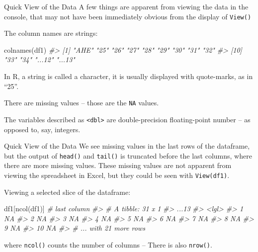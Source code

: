 \documentclass[
  11pt,
  ignorenonframetext,
  svgnames, handout, t]{beamer}
\newenvironment{Shaded}{\begin{snugshade}}{\end{snugshade}}
\newcommand{\CommentTok}[1]{\textcolor[rgb]{0.56,0.35,0.01}{\textit{#1}}}
\newcommand{\FunctionTok}[1]{\textcolor[rgb]{0.00,0.00,0.00}{#1}}
\newcommand{\NormalTok}[1]{#1}
\begin{document}
\begin{frame}[fragile]{Quick View of the Data}
\protect\hypertarget{quick-view-of-the-data-2}{}
A few things are apparent from viewing the data in the console, that may
not have been immediately obvious from the display of \texttt{View()}

The column names are strings:

\footnotesize

\begin{Shaded}
\begin{Highlighting}[]
\FunctionTok{colnames}\NormalTok{(df1)}
\CommentTok{\#\textgreater{}  [1] "AHE"   "25"    "26"    "27"    "28"    "29"    "30"    "31"    "32"   }
\CommentTok{\#\textgreater{} [10] "33"    "34"    "...12" "...13"}
\end{Highlighting}
\end{Shaded}

\normalsize

In R, a string is called a character, it is usually displayed with
quote-marks, as in ``25''.

There are missing values -- those are the \texttt{NA} values.

The variables described as \texttt{\textless{}dbl\textgreater{}} are
double-precision floating-point number -- as opposed to, say, integers.
\end{frame}

\begin{frame}[fragile]{Quick View of the Data}
\protect\hypertarget{quick-view-of-the-data-3}{}
We see missing values in the last rows of the dataframe, but the output
of \texttt{head()} and \texttt{tail()} is truncated before the last
columns, where there are more missing values. These missing values are
not apparent from viewing the spreadsheet in Excel, but they could be
seen with \texttt{View(df1)}.

Viewing a selected slice of the dataframe:

\footnotesize

\begin{Shaded}
\begin{Highlighting}[]
\NormalTok{df1[}\FunctionTok{ncol}\NormalTok{(df1)]  }\CommentTok{\# last column}
\CommentTok{\#\textgreater{} \# A tibble: 31 x 1}
\CommentTok{\#\textgreater{}    ...13}
\CommentTok{\#\textgreater{}    \textless{}lgl\textgreater{}}
\CommentTok{\#\textgreater{}  1 NA   }
\CommentTok{\#\textgreater{}  2 NA   }
\CommentTok{\#\textgreater{}  3 NA   }
\CommentTok{\#\textgreater{}  4 NA   }
\CommentTok{\#\textgreater{}  5 NA   }
\CommentTok{\#\textgreater{}  6 NA   }
\CommentTok{\#\textgreater{}  7 NA   }
\CommentTok{\#\textgreater{}  8 NA   }
\CommentTok{\#\textgreater{}  9 NA   }
\CommentTok{\#\textgreater{} 10 NA   }
\CommentTok{\#\textgreater{} \# ... with 21 more rows}
\end{Highlighting}
\end{Shaded}

\normalsize where \texttt{ncol()} counts the number of columns -- There
is also \texttt{nrow()}.
\end{frame}
\end{document}
